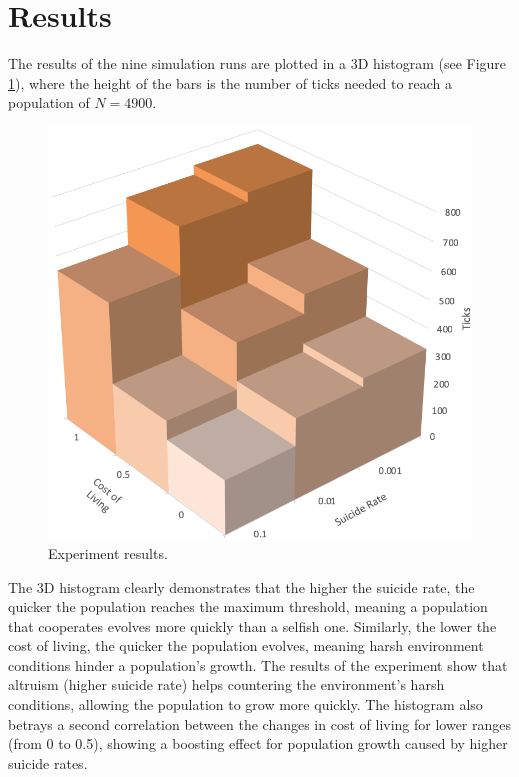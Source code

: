 \documentclass[a4paper,12pt,twocolumn]{article}
\begin{document}

\section{Results}
\label{sec:results}

The results of the nine simulation runs are plotted in a 3D histogram (see Figure \ref{fig:3d-histogram}), where the height of the bars is the number of ticks needed to reach a population of $N=4900$.

\begin{figure}[!htbp]
\centering
\includegraphics[scale=0.6]{figures/3d_histogram.png}
\caption{Experiment results.}
\label{fig:3d-histogram} 
\end{figure}

The 3D histogram clearly demonstrates that the higher the suicide rate, the quicker the population reaches the maximum threshold, meaning a population that cooperates evolves more quickly than a selfish one. Similarly, the lower the cost of living, the quicker the population evolves, meaning harsh environment conditions hinder a population's growth. The results of the experiment show that altruism (higher suicide rate) helps countering the environment's harsh conditions, allowing the population to grow more quickly. The histogram also betrays a second correlation between the changes in cost of living for lower ranges (from 0 to 0.5), showing a boosting effect for population growth caused by higher suicide rates.
\end{document}
